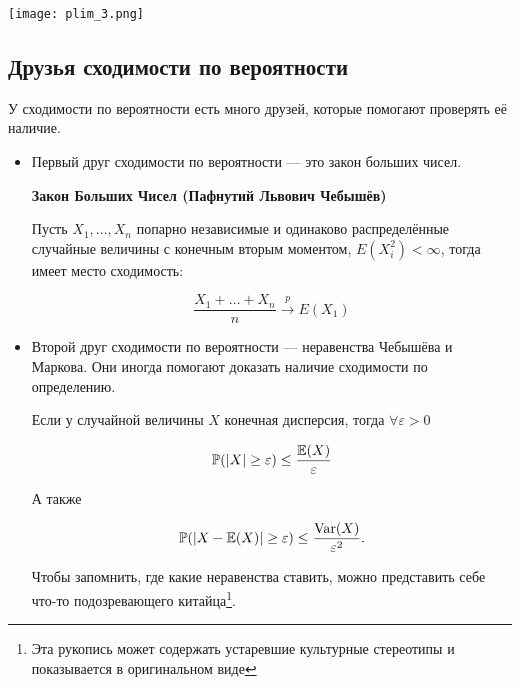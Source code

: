 \documentclass[12pt, a4paper, oneside]{article}
\begin{document}
\begin{center} 
\texttt{[image: plim\_3.png]}
\end{center} 

\subsection{Друзья сходимости по вероятности}

У сходимости по вероятности есть много друзей, которые помогают проверять её наличие.

\begin{itemize} 
\item Первый друг сходимости по вероятности --- это закон больших чисел. 

\begin{theorem}{\textbf{Закон Больших Чисел (Пафнутий Львович Чебышёв)}}

Пусть $X_1, \ldots, X_n$ попарно независимые и одинаково распределённые случайные величины с конечным вторым моментом, $E(X_i^2) < \infty$, тогда имеет место сходимость:

$$
\frac{X_1 + \ldots + X_n}{n} \overset{p}{\to} E(X_1)
$$
\end{theorem}

\item Второй друг сходимости по вероятности --- неравенства Чебышёва и Маркова. Они иногда помогают доказать наличие сходимости по определению.

\begin{theorem}
Если у случайной величины $X$ конечная дисперсия, тогда $\forall \varepsilon > 0$

$$
\mathbb{P}(|X| \ge \varepsilon) \le \frac{\mathbb{E}(X)}{\varepsilon}
$$

А также 

$$
\mathbb{P}(|X - \mathbb{E}(X)| \ge \varepsilon) \le \frac{\operatorname{Var}(X)}{\varepsilon^2}.
$$
\end{theorem}

Чтобы запомнить, где какие неравенства ставить, можно представить себе что-то подозревающего китайца\footnote{Эта рукопись может содержать устаревшие культурные стереотипы и показывается в оригинальном виде}. 

\begin{center} 
\end{center} 


\end{itemize}
\end{document}
